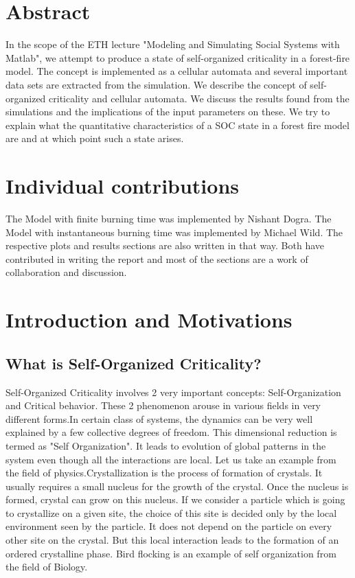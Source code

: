 \documentclass[11pt]{article}
\begin{document}



\section{Abstract}
In the scope of the ETH lecture "Modeling and Simulating Social Systems with Matlab", we attempt to produce a state of self-organized criticality in a forest-fire model. The concept is implemented as a cellular automata and several important data sets are extracted from the simulation. We describe the concept of self-organized criticality and cellular automata. We discuss the results found from the simulations and the implications of the input parameters on these. We try to explain what the quantitative characteristics of a SOC state in a forest fire model are and at which point such a state arises. 

\section{Individual contributions}
The Model with finite burning time was implemented by Nishant Dogra.
The Model with instantaneous burning time was implemented by Michael Wild.
The respective plots and results sections are also written in that way.
Both have contributed in writing the report and most of the sections are a work of collaboration and discussion.


\section{Introduction and Motivations}
\subsection{What is Self-Organized Criticality?}
Self-Organized Criticality involves 2 very important concepts: Self-Organization and Critical behavior. These 2 phenomenon arouse in various fields in very different forms.In certain class of systems, the dynamics can be very well explained by a few collective degrees of freedom. This dimensional reduction is termed as "Self Organization". It leads to evolution of global patterns in the system even though all the interactions are local. Let us take an example from the field of physics.Crystallization is the process of formation of crystals. It usually requires a small nucleus for the growth of the crystal. Once the nucleus is formed, crystal can grow on this nucleus. If we consider a particle which is going to crystallize on a given site, the choice of this site is decided only by the local environment seen by the particle. It does not depend on the particle on every other site on the crystal. But this local interaction leads to the formation of an ordered crystalline phase. Bird flocking is an example of self organization from the field of Biology.
\end{document}
